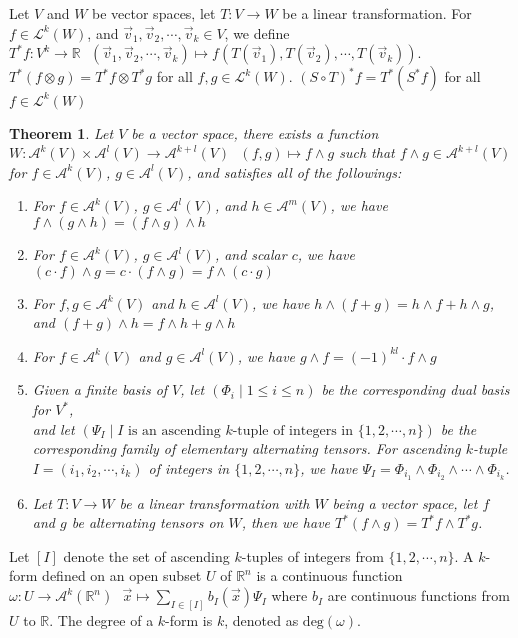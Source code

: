 \documentclass[9pt]{article}
\theoremstyle{break}
\theoremstyle{break}
\newtheorem{thm}{Theorem}[section]
\newcommand{\R}{\mathbb{R}}
\newcommand{\Lt}{\mathcal{L}}
\newcommand{\A}{\mathcal{A}}
\begin{document}
Let $V$ and $W$ be vector spaces, let $T:V \to W$ be a linear transformation. For $f \in \Lt^k(W)$, and $\vec{v}_1,\vec{v}_2,\cdots, \vec{v}_k \in V$, we define $T^*f:V^k \to \R \ \ \ (\vec{v}_1,\vec{v}_2,\cdots, \vec{v}_k ) \mapsto f\left(T(\vec{v}_1),T(\vec{v}_2),\cdots, T(\vec{v}_k) \right) $.\\
$T^*(f\otimes g) = T^*f \otimes T^* g$ for all $f,g \in \Lt^k(W)$. $(S\circ T)^*f = T^*(S^*f)$ for all $f \in \Lt^k(W)$

\begin{thm}
Let $V$ be a vector space, there exists a function $W:\A^k(V) \times \A^l(V) \to \A^{k+l}(V) \ \ \ (f,g)\mapsto f \wedge g$ such that $f\wedge g \in \A^{k+l}(V)$ for $f \in \A^k(V)$, $g \in \A^l(V)$, and satisfies all of the followings:
\begin{enumerate}[topsep=3pt,itemsep=-1ex,partopsep=1ex,parsep=1ex]
\item For $f \in \A^k(V)$, $g \in \A^l(V)$, and $h \in \A^m(V)$, we have $f\wedge(g\wedge h) = (f\wedge g) \wedge h$
\item For $f \in \A^k(V)$, $g \in \A^l(V)$, and scalar $c$, we have $(c\cdot f) \wedge g = c\cdot (f\wedge g) = f\wedge (c\cdot g)$
\item For $f,g \in \A^k(V)$ and $h \in \A^l(V)$, we have $h\wedge (f+g) = h\wedge f + h\wedge g$, and $(f+g)\wedge h = f\wedge h + g \wedge h$
\item For $f \in \A^k(V)$ and $g \in \A^l(V)$, we have $g\wedge f = (-1)^{kl} \cdot f\wedge g$
\item Given a finite basis of $V$, let $(\Phi_i \mid 1 \leq i \leq n)$ be the corresponding dual basis for $V^*$, \\and let $(\Psi_I\mid I \text{ is an ascending }k\text{-tuple}\text{ of integers in }\{1,2,\cdots, n\})$ be the corresponding family of elementary alternating tensors. For ascending $k$-tuple $I = (i_1,i_2,\cdots, i_k)$ of integers in $\{1,2,\cdots, n\}$, we have $\Psi_I = \Phi_{i_1}\wedge \Phi_{i_2}\wedge \cdots \wedge \Phi_{i_k}$. 
\item Let $T:V\to W$ be a linear transformation with $W$ being a vector space, let $f$ and $g$ be alternating tensors on $W$, then we have $T^*(f\wedge g) = T^*f \wedge T^* g$. 
\end{enumerate}
\end{thm}

Let $[I]$ denote the set of ascending $k$-tuples of integers from $\{1,2,\cdots, n\}$. A $k$-form defined on an open subset $U$ of $\R^n$ is a continuous function $\omega:U \to \A^k(\R^n) \ \ \ \vec{x}\mapsto \sum_{I \in [I]} b_I(\vec{x}) \Psi_I$
where $b_I$ are continuous functions from $U$ to $\R$. The degree of a $k$-form is $k$, denoted as $\text{deg}(\omega)$. \\
\end{document}
